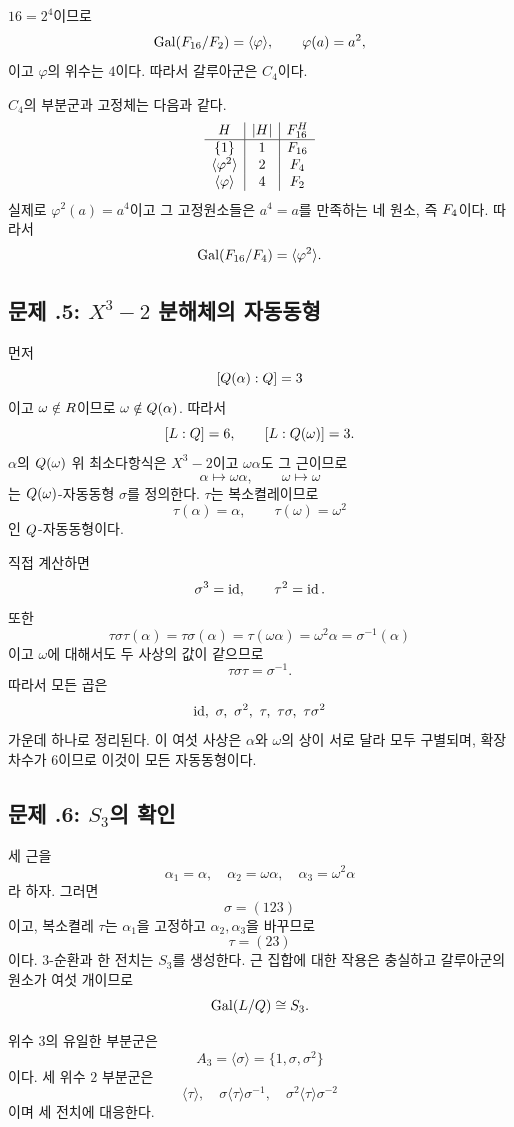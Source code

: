 \begin{solution}
$16=2^4$이므로
\[
  \operatorname{Gal}(F_{16}/F_2)
  =\langle\varphi\rangle,
  \qquad
  \varphi(a)=a^2,
\]
이고 $\varphi$의 위수는 $4$이다. 따라서 갈루아군은 $C_4$이다.

$C_4$의 부분군과 고정체는 다음과 같다.
\[
\begin{array}{c|c|c}
H & |H| & F_{16}^H\\
\hline
\{1\} & 1 & F_{16}\\
\langle\varphi^2\rangle & 2 & F_4\\
\langle\varphi\rangle & 4 & F_2
\end{array}
\]
실제로 $\varphi^2(a)=a^4$이고 그 고정원소들은 $a^4=a$를 만족하는 네 원소, 즉 $F_4$이다. 따라서
\[
  \operatorname{Gal}(F_{16}/F_4)=\langle\varphi^2\rangle.
\]
\end{solution}

\subsection*{문제 \thechapter.5: $X^3-2$ 분해체의 자동동형}

\begin{solution}
먼저
\[
  [Q(\alpha):Q]=3
\]
이고 $\omega\notin R$이므로 $\omega\notin Q(\alpha)$. 따라서
\[
  [L:Q]=6,
  \qquad
  [L:Q(\omega)]=3.
\]
$\alpha$의 $Q(\omega)$ 위 최소다항식은 $X^3-2$이고 $\omega\alpha$도 그 근이므로
\[
  \alpha\longmapsto\omega\alpha,
  \qquad
  \omega\longmapsto\omega
\]
는 $Q(\omega)$-자동동형 $\sigma$를 정의한다. $\tau$는 복소켤레이므로
\[
  \tau(\alpha)=\alpha,
  \qquad
  \tau(\omega)=\omega^2
\]
인 $Q$-자동동형이다.

직접 계산하면
\[
  \sigma^3=\operatorname{id},
  \qquad
  \tau^2=\operatorname{id}.
\]
또한
\[
  \tau\sigma\tau(\alpha)
  =\tau\sigma(\alpha)
  =\tau(\omega\alpha)
  =\omega^2\alpha
  =\sigma^{-1}(\alpha)
\]
이고 $\omega$에 대해서도 두 사상의 값이 같으므로
\[
  \tau\sigma\tau=\sigma^{-1}.
\]
따라서 모든 곱은
\[
  \operatorname{id},\ \sigma,\ \sigma^2,
  \ \tau,\ \tau\sigma,\ \tau\sigma^2
\]
가운데 하나로 정리된다. 이 여섯 사상은 $\alpha$와 $\omega$의 상이 서로 달라 모두 구별되며, 확장차수가 $6$이므로 이것이 모든 자동동형이다.
\end{solution}

\subsection*{문제 \thechapter.6: $S_3$의 확인}

\begin{solution}
세 근을
\[
  \alpha_1=\alpha,
  \quad
  \alpha_2=\omega\alpha,
  \quad
  \alpha_3=\omega^2\alpha
\]
라 하자. 그러면
\[
  \sigma=(123)
\]
이고, 복소켤레 $\tau$는 $\alpha_1$을 고정하고 $\alpha_2,\alpha_3$을 바꾸므로
\[
  \tau=(23)
\]
이다. $3$-순환과 한 전치는 $S_3$를 생성한다. 근 집합에 대한 작용은 충실하고 갈루아군의 원소가 여섯 개이므로
\[
  \operatorname{Gal}(L/Q)\cong S_3.
\]

위수 $3$의 유일한 부분군은
\[
  A_3=\langle\sigma\rangle
  =\{1,\sigma,\sigma^2\}
\]
이다. 세 위수 $2$ 부분군은
\[
  \langle\tau\rangle,
  \quad
  \sigma\langle\tau\rangle\sigma^{-1},
  \quad
  \sigma^2\langle\tau\rangle\sigma^{-2}
\]
이며 세 전치에 대응한다.
\end{solution}

